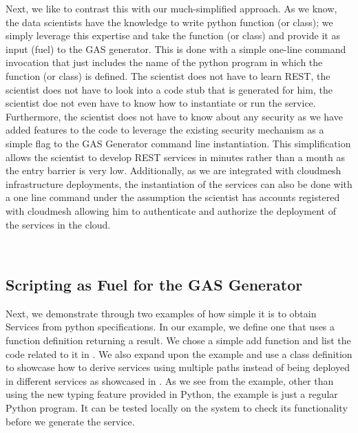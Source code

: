 Next, we like to contrast this with our much-simplified approach. As we know, the data scientists have the knowledge to write python function (or class); we simply leverage this expertise and take the function (or class) and provide it as input (fuel) to the GAS generator. This is done with a simple one-line command invocation that just includes the name of the python program in which the function (or class) is defined. The scientist does not have to learn REST, the scientist does not have to look into a code stub that is generated for him, the scientist doe not even have to know how to instantiate or run the service. Furthermore, the scientist does not have to know about any security as we have added features to the code to leverage the existing security mechanism as a simple flag to the GAS Generator command line instantiation. This simplification allows the scientist to develop REST services in minutes rather than a month as the entry barrier is very low. Additionally, as we are integrated with cloudmesh infrastructure deployments, the instantiation of the services can also be done with a one line command under the assumption the scientist has accounts registered with cloudmesh allowing him to authenticate and authorize the deployment of the services in the cloud. 

\begin{figure}[htb]

\begin{minipage}[b]{0.48\columnwidth}

\end{minipage}
\ \
\begin{minipage}[b]{0.48\columnwidth}

\end{minipage}

\end{figure}


\subsection{Scripting as Fuel for the GAS Generator}

Next, we demonstrate through two examples of how simple it is to obtain Services from python specifications. In our example, we define one that uses a function definition returning a result. We chose a simple add function and list the code related to it in . We also expand upon the example and use a class definition to showcase how to derive services using multiple paths instead of being deployed in different services as showcased in . As we see from the example, other than using the new typing feature provided in Python, the example is just a regular Python program. It can be tested locally on the system to check its functionality before we generate the service.

